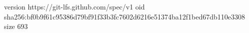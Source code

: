 version https://git-lfs.github.com/spec/v1
oid sha256:bf0b9f61c95386d79bf91f33b3fc7602d6216e51374ba12f1bed67db110e3308
size 693
